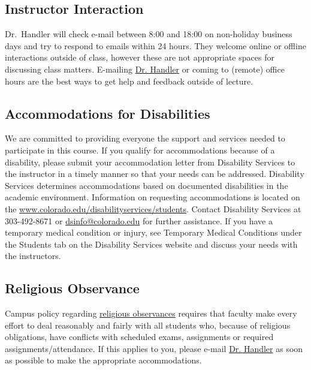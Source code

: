 \documentclass[10pt]{memoir}
\makeatletter
\def\instructorAemail{abram.handler@colorado.edu}
\makeatother
\begin{document}

\subsection{Instructor Interaction}
Dr.\ Handler will check e-mail between 8:00 and 18:00 on non-holiday business days and try to respond to emails within 24 hours. They welcome online or offline interactions outside of class, however these are not appropriate spaces for discussing class matters. E-mailing \href{\instructorAemail}{Dr. Handler} or coming to (remote) office hours are the best ways to get help and feedback outside of lecture.

\subsection{Accommodations for Disabilities}
We are committed to providing everyone the support and services needed to participate in this course. If you qualify for accommodations because of a disability, please submit your accommodation letter from Disability Services to the instructor in a timely manner so that your needs can be addressed. Disability Services determines accommodations based on documented disabilities in the academic environment. Information on requesting accommodations is located on the \href{Disability Services website}{www.colorado.edu/disabilityservices/students}. Contact Disability Services at 303-492-8671 or \href{mailto:dsinfo@colorado.edu}{dsinfo@colorado.edu} for further assistance. If you have a temporary medical condition or injury, see Temporary Medical Conditions under the Students tab on the Disability Services website and discuss your needs with the instructors.

\subsection{Religious Observance}
Campus policy regarding \href{http://www.colorado.edu/policies/observance-religious-holidays-and-absences-classes-andor-exams}{religious observances} requires that faculty make every effort to deal reasonably and fairly with all students who, because of religious obligations, have conflicts with scheduled exams, assignments or required assignments/attendance. If this applies to you, please e-mail \href{\instructorAemail}{Dr. Handler} as soon as possible to make the appropriate accommodations.
\end{document}
